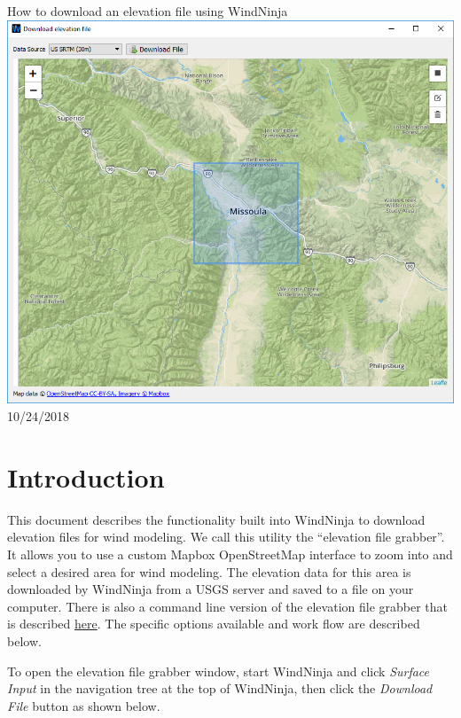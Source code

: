 \documentclass[12pt]{article}
\begin{document}
\begin{titlepage}
    \centering
    {\Huge
       How to download an elevation file using WindNinja
    }    
    \vfill
    \includegraphics[scale=0.75]{dem_download_0}
    \vfill
  	{\Huge
	  10/24/2018 %
  	}
    \vfill
\end{titlepage}


\section*{Introduction}
This document describes the functionality built into WindNinja to download
elevation files for wind modeling.  We call this utility the “elevation file
grabber”.  It allows you to use a custom \textcopyright Mapbox \textcopyright OpenStreetMap interface to zoom into
and select a desired area for wind modeling. The elevation data for this area
is downloaded by WindNinja from a USGS server and saved to a file on your
computer.  There is also a command line version of the elevation file grabber
that is described \href{http://firelab.github.io/windninja/pdf/fetch_dem_instructions.pdf}{here}.  The specific
options available and work flow are described below.

To open the elevation file grabber window, start WindNinja and click \textit{Surface Input} in the navigation tree at the top of WindNinja, then click the \textit{Download File} button as shown below.
\end{document}
